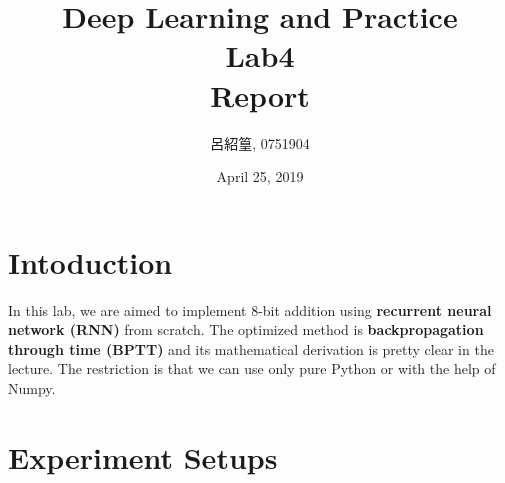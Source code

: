 \documentclass[12pt,a4paper]{article}
\title{Deep Learning and Practice \\Lab4 \\ Report}
\date{April 25, 2019}
\author{呂紹篁, 0751904}
\begin{document}
\thispagestyle{plain}
\cfoot{}
\maketitle

\section{Intoduction} \label{sec:intro}
In this lab, we are aimed to implement 8-bit addition using \textbf{recurrent neural network (RNN)} from scratch. The optimized method is \textbf{backpropagation through time (BPTT)} and its mathematical derivation is pretty clear in the lecture. The restriction is that we can use only pure Python or with the help of Numpy.

\section{Experiment Setups} \label{sec:exp_setup}
\end{document}
